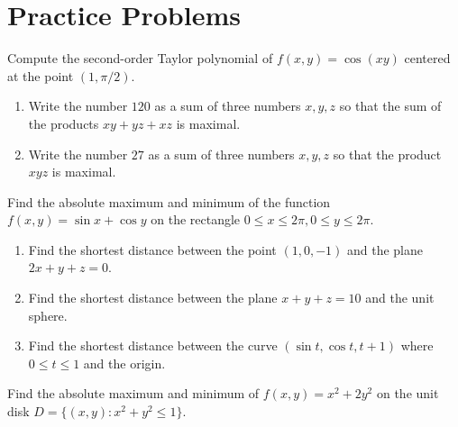 \documentclass[openany]{book}
\begin{document}
\chapter{Practice Problems}


\begin{prob}
    Compute the second-order Taylor polynomial of $f(x,y)=\cos(xy)$ centered at the point $(1,\pi/2)$. 
\end{prob}



\begin{prob}
    \begin{enumerate}
        \item Write the number $120$ as a sum of three numbers $x,y,z$ so that the sum of the products $xy+yz+xz$ is maximal.
        \item Write the number $27$ as a sum of three numbers $x,y,z$ so that the product $xyz$ is maximal.
    \end{enumerate}
\end{prob}


\begin{prob}
    Find the absolute maximum and minimum of the function $f(x,y)=\sin x+\cos y$ on the rectangle $0\leq x\leq 2\pi, 0\leq y\leq 2\pi$.
\end{prob}


\begin{prob}
    \begin{enumerate}
        \item Find the shortest distance between the point $(1,0,-1)$ and the plane $2x+y+z=0$.
        \item Find the shortest distance between the plane $x+y+z=10$ and the unit sphere. 
        \item Find the shortest distance between the curve $(\sin t, \cos t, t+1)$ where $0\leq t\leq 1$ and the origin.
    \end{enumerate}
\end{prob}



\begin{prob}
    Find the absolute maximum and minimum of $f(x,y)=x^2+2y^2$ on the unit disk $D=\{(x,y): x^2+y^2\leq 1\}$.
\end{prob}
\end{document}
